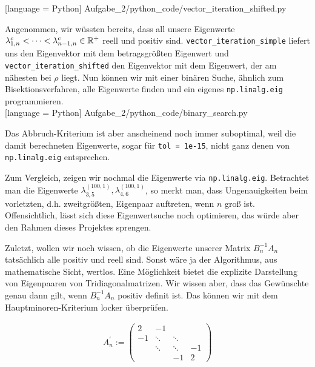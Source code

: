 
[language = Python]
{Aufgabe_2/python_code/vector_iteration_shifted.py}
\vspace{10pt}

Angenommen, wir wüssten bereits, dass all unsere Eigenwerte $\lambda_{1, n}^c < \cdots < \lambda_{n-1, n}^c \in \mathbb{R}^+$ reell und positiv sind. \verb|vector_iteration_simple| liefert uns den Eigenvektor mit dem betragsgrößten Eigenwert und \verb|vector_iteration_shifted| den Eigenvektor mit dem Eigenwert, der am nähesten bei $\rho$ liegt. Nun können wir mit einer binären Suche, ähnlich zum Bisektionsverfahren, alle Eigenwerte finden und ein eigenes \verb|np.linalg.eig| programmieren. \\


[language = Python]
{Aufgabe_2/python_code/binary_search.py}
\vspace{10pt}

Das Abbruch-Kriterium ist aber anscheinend noch immer suboptimal, weil die damit berechneten Eigenwerte, sogar für \verb|tol = 1e-15|, nicht ganz denen von \verb|np.linalg.eig| entsprechen. \\


\vspace{10pt}

Zum Vergleich, zeigen wir nochmal die Eigenwerte via \verb|np.linalg.eig|. Betrachtet man die Eigenwerte $\lambda_{3, 5}^{(100, 1)}, \lambda_{4, 6}^{(100, 1)}$, so merkt man, dass Ungenauigkeiten beim vorletzten, d.h. zweitgrößten, Eigenpaar auftreten, wenn $n$ groß ist. Offensichtlich, lässt sich diese Eigenwertsuche noch optimieren, das würde aber den Rahmen dieses Projektes sprengen. \\


\vspace{10pt}

Zuletzt, wollen wir noch wissen, ob die Eigenwerte unserer Matrix $B_n^{-1} A_n$ tatsächlich alle positiv und reell sind. Sonst wäre ja der Algorithmus, aus mathematische Sicht, wertlos. Eine Möglichkeit bietet die explizite Darstellung von Eigenpaaren von Tridiagonalmatrizen. Wir wissen aber, dass das Gewünschte genau dann gilt, wenn $B_n^{-1} A_n$ positiv definit ist. Das können wir mit dem Hauptminoren-Kriterium locker überprüfen.

\begin{align*}
  A_n^\prime :=
  \begin{pmatrix}
     2 &  -1     &        &    \\
    -1 &  \ddots & \ddots &    \\
       &  \ddots & \ddots & -1 \\
       &         & -1     &  2
  \end{pmatrix}
\end{align*}

